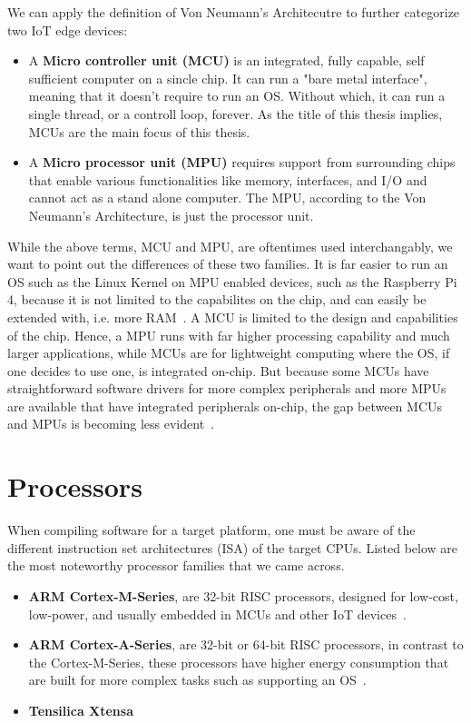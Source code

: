 We can apply the definition of Von Neumann's Architecutre to further categorize two IoT edge devices:
\begin{itemize}
\item A \textbf{Micro controller unit (MCU)} is an integrated, fully capable, self sufficient computer on a sincle chip. It can run a "bare metal interface", meaning that it doesn't require to run an OS. Without which, it can run a single thread, or a controll loop, forever. As the title of this thesis implies, MCUs are the main focus of this thesis. 
\item A \textbf{Micro processor unit (MPU)} requires support from surrounding chips that enable various functionalities like memory, interfaces, and I/O and cannot act as a stand alone computer. The MPU, according to the Von Neumann's Architecture, is just the processor unit.
\end{itemize}
While the above terms, MCU and MPU, are oftentimes used interchangably, we want to point out the differences of these two families. It is far easier to run an OS such as the Linux Kernel \cite{raspberrypios} on MPU enabled devices, such as the Raspberry Pi 4, because it is not limited to the capabilites on the chip, and can easily be extended with, i.e. more RAM~\cite{raspberrypi4}. A MCU is limited to the design and capabilities of the chip. Hence, a MPU runs with far higher processing capability and much larger applications, while MCUs are for lightweight computing where the OS, if one decides to use one, is integrated on-chip. 
But because some MCUs have straightforward software drivers for more complex peripherals and more MPUs are available that have integrated peripherals on-chip, the gap between MCUs and MPUs is becoming less evident~\cite{peterson2021mcu, thornton2017mcu}.
%

\section {Processors}
When compiling software for a target platform, one must be aware of the different instruction set architectures (ISA) of the target CPUs. Listed below are the most noteworthy processor families that we came across.

\begin{itemize}
\item \textbf{ARM Cortex-M-Series}, are 32-bit RISC processors, designed for low-cost, low-power, and usually embedded in MCUs and other IoT devices~\cite{cortexm}.
\item \textbf{ARM Cortex-A-Series}, are 32-bit or 64-bit RISC processors, in contrast to the Cortex-M-Series, these processors have higher energy consumption that are built for more complex tasks such as supporting an OS~\cite{cortexa}.
\item \textbf{Tensilica Xtensa}
\end{itemize}

